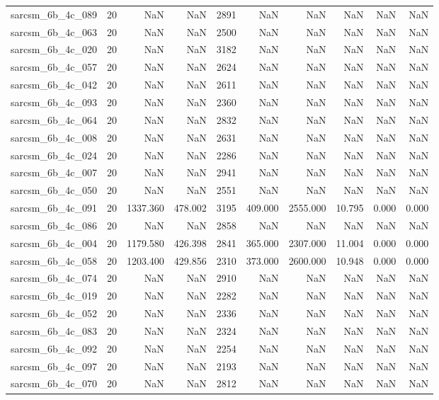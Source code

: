 \begin{tabular}{lrrrrrrrrr}
sarcsm\_6b\_4c\_089 & 20 & NaN & NaN & 2891 & NaN & NaN & NaN & NaN & NaN \\
sarcsm\_6b\_4c\_063 & 20 & NaN & NaN & 2500 & NaN & NaN & NaN & NaN & NaN \\
sarcsm\_6b\_4c\_020 & 20 & NaN & NaN & 3182 & NaN & NaN & NaN & NaN & NaN \\
sarcsm\_6b\_4c\_057 & 20 & NaN & NaN & 2624 & NaN & NaN & NaN & NaN & NaN \\
sarcsm\_6b\_4c\_042 & 20 & NaN & NaN & 2611 & NaN & NaN & NaN & NaN & NaN \\
sarcsm\_6b\_4c\_093 & 20 & NaN & NaN & 2360 & NaN & NaN & NaN & NaN & NaN \\
sarcsm\_6b\_4c\_064 & 20 & NaN & NaN & 2832 & NaN & NaN & NaN & NaN & NaN \\
sarcsm\_6b\_4c\_008 & 20 & NaN & NaN & 2631 & NaN & NaN & NaN & NaN & NaN \\
sarcsm\_6b\_4c\_024 & 20 & NaN & NaN & 2286 & NaN & NaN & NaN & NaN & NaN \\
sarcsm\_6b\_4c\_007 & 20 & NaN & NaN & 2941 & NaN & NaN & NaN & NaN & NaN \\
sarcsm\_6b\_4c\_050 & 20 & NaN & NaN & 2551 & NaN & NaN & NaN & NaN & NaN \\
sarcsm\_6b\_4c\_091 & 20 & 1337.360 & 478.002 & 3195 & 409.000 & 2555.000 & 10.795 & 0.000 & 0.000 \\
sarcsm\_6b\_4c\_086 & 20 & NaN & NaN & 2858 & NaN & NaN & NaN & NaN & NaN \\
sarcsm\_6b\_4c\_004 & 20 & 1179.580 & 426.398 & 2841 & 365.000 & 2307.000 & 11.004 & 0.000 & 0.000 \\
sarcsm\_6b\_4c\_058 & 20 & 1203.400 & 429.856 & 2310 & 373.000 & 2600.000 & 10.948 & 0.000 & 0.000 \\
sarcsm\_6b\_4c\_074 & 20 & NaN & NaN & 2910 & NaN & NaN & NaN & NaN & NaN \\
sarcsm\_6b\_4c\_019 & 20 & NaN & NaN & 2282 & NaN & NaN & NaN & NaN & NaN \\
sarcsm\_6b\_4c\_052 & 20 & NaN & NaN & 2336 & NaN & NaN & NaN & NaN & NaN \\
sarcsm\_6b\_4c\_083 & 20 & NaN & NaN & 2324 & NaN & NaN & NaN & NaN & NaN \\
sarcsm\_6b\_4c\_092 & 20 & NaN & NaN & 2254 & NaN & NaN & NaN & NaN & NaN \\
sarcsm\_6b\_4c\_097 & 20 & NaN & NaN & 2193 & NaN & NaN & NaN & NaN & NaN \\
sarcsm\_6b\_4c\_070 & 20 & NaN & NaN & 2812 & NaN & NaN & NaN & NaN & NaN \\

\end{tabular}
